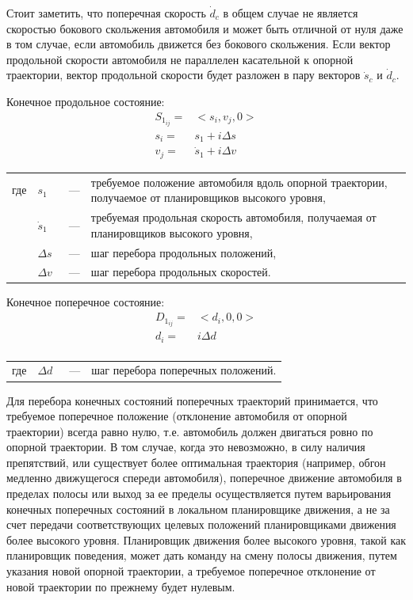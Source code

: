 Стоит заметить, что поперечная скорость $\dot{d}_c$ в общем случае не является скоростью бокового скольжения автомобиля
и может быть отличной от нуля даже в том случае, если автомобиль движется без бокового скольжения. Если вектор
продольной скорости автомобиля не параллелен касательной к опорной траектории, вектор продольной скорости будет разложен
в пару векторов $\dot{s}_c$ и $\dot{d}_c$.

Конечное продольное состояние:
\begin{equation}
      \begin{aligned}
            S_{1_{ij}} =& <s_i, v_j, 0> \\
            s_i =& s_1 + i\Delta s \\
            v_j =& \dot{s}_1 + i\Delta v
      \end{aligned}
\end{equation}
\noindent\begin{tabularx}{\linewidth}{lllX}
      где & $s_1$       &~---& требуемое положение автомобиля вдоль опорной траектории, получаемое от планировщиков высокого уровня, \\
          & $\dot{s}_1$ &~---& требуемая продольная скорость автомобиля, получаемая от планировщиков высокого уровня, \\
          & $\Delta s$  &~---& шаг перебора продольных положений, \\
          & $\Delta v$  &~---& шаг перебора продольных скоростей.
\end{tabularx}

Конечное поперечное состояние:
\begin{equation}
      \begin{aligned}
            D_{1_{ij}} =& <d_i, 0, 0> \\
            d_i =& i\Delta d \\
      \end{aligned}
\end{equation}
\noindent\begin{tabularx}{\linewidth}{lllX}
      где & $\Delta d$  &~---& шаг перебора поперечных положений.
\end{tabularx}

Для перебора конечных состояний поперечных траекторий принимается, что требуемое поперечное положение (отклонение
автомобиля от опорной траектории) всегда равно нулю, т.е. автомобиль должен двигаться ровно по опорной траектории.
В том случае, когда это невозможно, в силу наличия препятствий, или существует более оптимальная траектория (например,
обгон медленно движущегося спереди автомобиля), поперечное движение автомобиля в пределах полосы или выход за ее пределы
осуществляется путем варьирования конечных поперечных состояний в локальном планировщике движения, а не за счет передачи
соответствующих целевых положений планировщиками движения более высокого уровня. Планировщик движения более
высокого уровня, такой как планировщик поведения, может дать команду на смену полосы движения, путем указания
новой опорной траектории, а требуемое  поперечное отклонение от новой траектории по прежнему будет нулевым.

